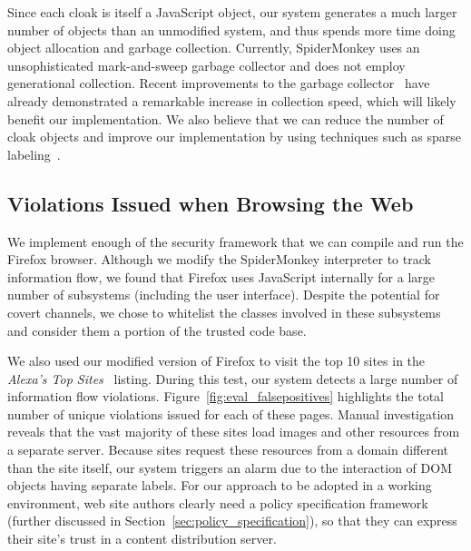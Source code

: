 Since each cloak is itself a JavaScript object, our system generates a much larger number of objects than an unmodified system, and thus spends more time doing object allocation and garbage collection.
Currently, SpiderMonkey uses an unsophisticated mark-and-sweep garbage collector and does not employ generational collection.
Recent improvements to the garbage collector~\cite{wagner2011} have already demonstrated a remarkable increase in collection speed, which will likely benefit our implementation.
We also believe that we can reduce the number of cloak objects and improve our implementation by using techniques such as sparse labeling~\cite{1554353,1814220}.


\subsection{Violations Issued when Browsing the Web}
We implement enough of the security framework that we can compile and run the Firefox browser.
Although we modify the SpiderMonkey interpreter to track information flow, we found that Firefox uses JavaScript internally for a large number of subsystems (including the user interface).
Despite the potential for covert channels, we chose to whitelist the classes involved in these subsystems and consider them a portion of the trusted code base.


We also used our modified version of Firefox to visit the top 10 sites in the \textit{Alexa's Top Sites}~\cite{alexa} listing.
During this test, our system detects a large number of information flow violations.
Figure~\ref{fig:eval_falsepositives} highlights the total number of unique violations issued for each of these pages.
Manual investigation reveals that the vast majority of these sites load images and other resources from a separate server.
Because sites request these resources from a domain different than the site itself, our system triggers an alarm due to the interaction of DOM objects having separate labels.
For our approach to be adopted in a working environment, web site authors clearly need a policy specification framework (further discussed in Section~\ref{sec:policy_specification}), so that they can express their site's trust in a content distribution server.

